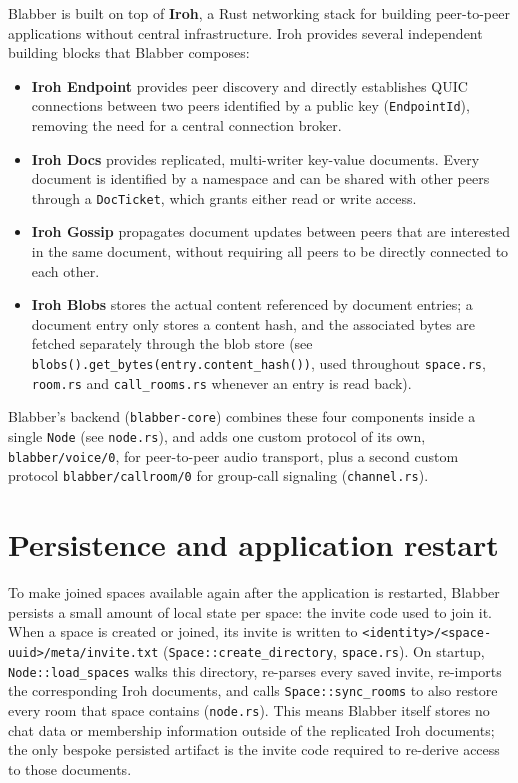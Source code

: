 Blabber is built on top of \textbf{Iroh}, a Rust networking stack for
building peer-to-peer applications without central infrastructure.
Iroh provides several independent building blocks that Blabber
composes:

\begin{itemize}
    \item \textbf{Iroh Endpoint} provides peer discovery and directly
    establishes QUIC connections between two peers identified by a
    public key (\texttt{EndpointId}), removing the need for a central
    connection broker.
    \item \textbf{Iroh Docs} provides replicated, multi-writer
    key-value documents. Every document is identified by a namespace
    and can be shared with other peers through a \texttt{DocTicket},
    which grants either read or write access.
    \item \textbf{Iroh Gossip} propagates document updates between
    peers that are interested in the same document, without requiring
    all peers to be directly connected to each other.
    \item \textbf{Iroh Blobs} stores the actual content referenced by
    document entries; a document entry only stores a content hash, and
    the associated bytes are fetched separately through the blob store
    (see \texttt{blobs().get\_bytes(entry.content\_hash())}, used
    throughout \texttt{space.rs}, \texttt{room.rs} and
    \texttt{call\_rooms.rs} whenever an entry is read back).
\end{itemize}

Blabber's backend (\texttt{blabber-core}) combines these four
components inside a single \texttt{Node} (see \texttt{node.rs}), and
adds one custom protocol of its own, \texttt{blabber/voice/0}, for
peer-to-peer audio transport, plus a second custom protocol
\texttt{blabber/callroom/0} for group-call signaling
(\texttt{channel.rs}).


\section{Persistence and application restart}

To make joined spaces available again after the application is
restarted, Blabber persists a small amount of local state per space:
the invite code used to join it. When a space is created or joined,
its invite is written to
\texttt{<identity>/<space-uuid>/meta/invite.txt}
(\texttt{Space::create\_directory}, \texttt{space.rs}). On startup,
\texttt{Node::load\_spaces} walks this directory, re-parses every
saved invite, re-imports the corresponding Iroh documents, and calls
\texttt{Space::sync\_rooms} to also restore every room that space
contains (\texttt{node.rs}). This means Blabber itself stores no chat
data or membership information outside of the replicated Iroh
documents; the only bespoke persisted artifact is the invite code
required to re-derive access to those documents.


